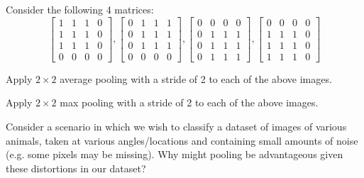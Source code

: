 Consider the following 4 matrices:
$$
\begin{bmatrix}
    1 & 1 & 1 & 0 \\
    1 & 1 & 1 & 0 \\
    1 & 1 & 1 & 0 \\
    0 & 0 & 0 & 0
\end{bmatrix},
%
\begin{bmatrix}
    0 & 1 & 1 & 1 \\
    0 & 1 & 1 & 1 \\
    0 & 1 & 1 & 1 \\
    0 & 0 & 0 & 0
\end{bmatrix},
%
\begin{bmatrix}
	0 & 0 & 0 & 0 \\
    0 & 1 & 1 & 1 \\
    0 & 1 & 1 & 1 \\
    0 & 1 & 1 & 1
\end{bmatrix},
%
\begin{bmatrix}
    0 & 0 & 0 & 0 \\
    1 & 1 & 1 & 0 \\
    1 & 1 & 1 & 0 \\
    1 & 1 & 1 & 0
\end{bmatrix}
$$
\problem[3]

Apply $2 \times 2$ average pooling with a stride of 2 to each of the above images.

\begin{subsolution}

\end{subsolution}

\newpage


\problem[3]

Apply $2 \times 2$ max pooling with a stride of 2 to each of the above images.

\begin{subsolution}

\end{subsolution}

\newpage


\problem[4]

Consider a scenario in which we wish to classify a dataset of images of various animals, taken at various angles/locations and containing small amounts of noise (e.g. some pixels may be missing). Why might pooling be advantageous given these distortions in our dataset?

\begin{subsolution}

\end{subsolution}

